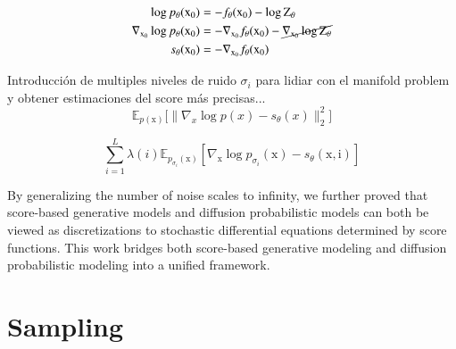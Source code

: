 \begin{equation}\label{eqn:score-function}
    \begin{split}
        \log p_{\theta}(\mathrm{x}_{0}) &= -f_{\theta}(\mathrm{x}_{0}) - \log \mathrm{Z}_{\theta}  \\
        \nabla_{\mathrm{x}_{0}}\log p_{\theta}(\mathrm{x}_{0}) &= -\nabla_{\mathrm{x}_{0}} f_{\theta}(\mathrm{x}_{0}) - \cancel{\nabla_{\mathrm{x}_{0}}\log \mathrm{Z}_{\theta}} \\
        s_{\theta}(\mathrm{x}_{0}) &= -\nabla_{\mathrm{x}_{0}} f_{\theta}(\mathrm{x}_{0})
    \end{split}
\end{equation}

\noindent Introducción de multiples niveles de ruido $\sigma_{i}$ para lidiar con el manifold problem y obtener estimaciones del score más precisas... \\

\begin{equation}
   \mathbb{E}_{p(\mathrm{x})}\bigg[\| \nabla_{x}\log p(x) - s_{\theta}(x)\|_{2}^{2} \bigg]
\end{equation}

\begin{equation}\label{train-objective-ncsn}
    \sum_{i=1}^{L} \lambda (i) \mathbb{E}_{p_{\sigma_{i}}(\mathrm{x})} [ \nabla_{\mathrm{x}} \log p_{\sigma_{i}}(\mathrm{x}) - s_{\theta}(\mathrm{x, i}) ]
\end{equation}

\noindent {} By generalizing the number of noise scales to infinity, we further proved that score-based generative models and diffusion probabilistic models can both be viewed as discretizations to stochastic differential equations determined by score functions. This work bridges both score-based generative modeling and diffusion probabilistic modeling into a unified framework.


\section{Sampling}\label{sec:sampling}

 \\

